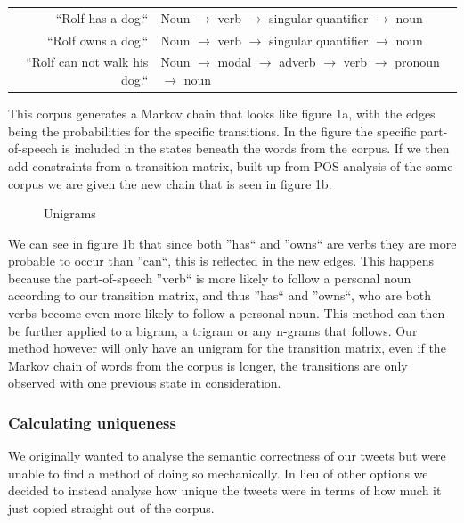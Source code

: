 \documentclass[a4paper,12pt]{article}
\begin{document}
\begin{tabular}{r | l}
``Rolf has a dog.`` & Noun $\to$ verb $\to$ singular quantifier $\to$ noun \\
``Rolf owns a dog.`` & Noun $\to$ verb $\to$ singular quantifier $\to$ noun \\
``Rolf can not walk his dog.`` & Noun $\to$ modal $\to$ adverb $\to$ verb $\to$ pronoun $\to$ noun \\
\end{tabular}

This corpus generates a Markov chain that looks like figure 1a, with the edges being the probabilities for the specific transitions. 
In the figure the specific part-of-speech is included in the states beneath the words from the corpus. 
If we then add constraints from a transition matrix, built up from POS-analysis of the same corpus we are given the new chain that is seen in figure 1b.

\begin{figure}[h!]
  \hfill
  \hfill
  \hfill
  \caption{Unigrams}
 \end{figure}



We can see in figure 1b that since both ''has`` and ''owns`` are verbs they are more probable to occur than ''can``, this is reflected in the new edges. 
This happens because the part-of-speech ''verb`` is more likely to follow a personal noun according to our transition matrix, and thus ''has`` and ''owns``, who are 
both verbs become even more likely to follow a personal noun. This method can then be further applied to a bigram, a trigram or any n-grams that follows. 
Our method however will only have an unigram for the transition matrix, even if the Markov chain of words from the corpus is longer, 
the transitions are only observed with one previous state in consideration.

\subsubsection{Calculating uniqueness}
We originally wanted to analyse the semantic correctness of our tweets but were unable to find a method of doing so mechanically. In lieu of other options we decided to instead analyse how unique the tweets were in terms of how much it just copied straight out of the corpus.
\end{document}
